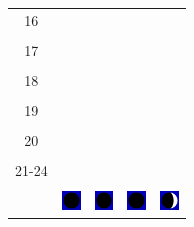 \documentclass[twoside, a4paper,12pt, tikz]{scrartcl}
\begin{document}
\begin{tabularx}{\linewidth}{|c|X|X|p{2cm}|p{2cm}|}
            &   &       &    &   \\
          \hline
          16&   &                 &    &   \\
            &   &       &    &   \\
          \hline
          17&   &                 &    &   \\
            &   &       &    &   \\
          \hline
          18&   &                 &    &   \\
            &   &       &    &   \\
          \hline
          19&   &                 &     &   \\
            &   &       &    &   \\
          \hline
          20&   &              &    &   \\
            &   &       &    &   \\
          \hline 
          21-24&   &              &    &   \\
            &   &       &    &   \\
          \hline
                      & \vspace{0.01cm} \centerline{\includegraphics[width=0.5cm]{moon_phases/Moon_phase_0.svg.png}} \vspace{0.1cm} & \vspace{0.01cm} \centerline{\includegraphics[width=0.5cm]{moon_phases/Moon_phase_0.svg.png}} \vspace{0.1cm} & \vspace{0.01cm} \centerline{\includegraphics[width=0.5cm]{moon_phases/Moon_phase_0.svg.png}} \vspace{0.1cm} & \vspace{0.01cm} \centerline{\includegraphics[width=0.5cm]{moon_phases/Moon_phase_1.svg.png}} \vspace{0.1cm}\\
          \hline    
        \end{tabularx}
\end{document}
